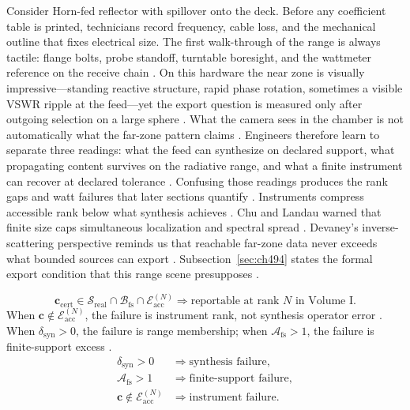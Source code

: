 \begin{physicalvignette}
Consider Horn-fed reflector with spillover onto the deck. Before any coefficient table is printed, technicians record frequency, cable loss, and the mechanical outline that fixes electrical size. The first walk-through of the range is always tactile: flange bolts, probe standoff, turntable boresight, and the wattmeter reference on the receive chain \cite{hansen1988}.
On this hardware the near zone is visually impressive---standing reactive structure, rapid phase rotation, sometimes a visible VSWR ripple at the feed---yet the export question is measured only after outgoing selection on a large sphere \cite{harrington2001}. What the camera sees in the chamber is not automatically what the far-zone pattern claims \cite{stratton1941}.
Engineers therefore learn to separate three readings: what the feed can synthesize on declared support, what propagating content survives on the radiative range, and what a finite instrument can recover at declared tolerance \cite{devaney2004}. Confusing those readings produces the rank gaps and watt failures that later sections quantify \cite{pal2026}.
Instruments compress accessible rank below what synthesis achieves . 
Chu and Landau warned that finite size caps simultaneous localization and spectral spread \cite{chu1948}. Devaney's inverse-scattering perspective reminds us that reachable far-zone data never exceeds what bounded sources can export \cite{devaney2004}.
Subsection~\ref{sec:ch494} states the formal export condition that this range scene presupposes \cite{stratton1941}.
\end{physicalvignette}
\begin{equation}
\label{eq:ch4.volume-I-measurement-cert}
\mathbf{c}_{\mathrm{cert}}\in\mathcal{S}_{\mathrm{real}}\cap\mathcal{B}_{\mathrm{fs}}\cap\mathcal{E}_{\mathrm{acc}}^{(N)}
\Longrightarrow
\text{reportable at rank }N\text{ in Volume I}.
\end{equation}
When \(\mathbf{c}\notin\mathcal{E}_{\mathrm{acc}}^{(N)}\), the failure is instrument rank, not synthesis operator error \cite{harrington2001}.
When \(\delta_{\mathrm{syn}}>0\), the failure is range membership; when \(\mathcal{A}_{\mathrm{fs}}>1\), the failure is finite-support excess
\cite{stratton1941}.
\begin{equation}
\label{eq:ch4.failure-matrix}
\begin{aligned}
\delta_{\mathrm{syn}}>0 &\Rightarrow\text{synthesis failure},\\
\mathcal{A}_{\mathrm{fs}}>1 &\Rightarrow\text{finite-support failure},\\
\mathbf{c}\notin\mathcal{E}_{\mathrm{acc}}^{(N)} &\Rightarrow\text{instrument failure}.
\end{aligned}
\end{equation}
